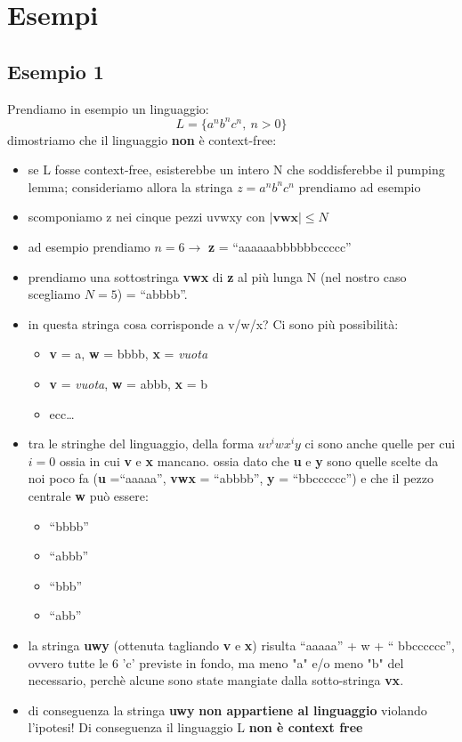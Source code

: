 \documentclass[a4paper]{report}
\begin{document}
\chapter{Esempi}
\section{Esempio 1}
Prendiamo in esempio un linguaggio:
\[ L = \{a^nb^nc^n,\ n > 0 \}\]
dimostriamo che il linguaggio \textbf{non} è context-free:
\begin{itemize}
\item se L fosse context-free, esisterebbe un intero N che soddisferebbe il pumping lemma; consideriamo allora la stringa \(z = a^nb^nc^n\) prendiamo ad esempio 
\item scomponiamo z nei cinque pezzi uvwxy con \(\left | \textbf{vwx} \right | \le N\)
\item ad esempio prendiamo \(n = 6 \rightarrow \) \textbf{z} = ``aaaaaabbbbbbccccc''
\item prendiamo una sottostringa \textbf{vwx} di \textbf{z} al più lunga N (nel nostro caso scegliamo \(N = 5\)) = ``abbbb''.
\item in questa stringa cosa corrisponde a v/w/x? Ci sono più possibilità:
\begin{itemize}
\item \textbf{v} = a, \textbf{w} = bbbb, \textbf{x} = \emph{vuota}
\item \textbf{v} = \emph{vuota}, \textbf{w} = abbb, \textbf{x} = b
\item ecc\dots
\end{itemize}
\item tra le stringhe del linguaggio, della forma \(uv^iwx^iy\) ci sono anche quelle per cui \(i = 0\) ossia in cui \textbf{v} e \textbf{x} mancano. ossia dato che \textbf{u} e \textbf{y} sono quelle scelte da noi poco fa (\textbf{u} =``aaaaa'', \textbf{vwx} = ``abbbb'', \textbf{y} = ``bbcccccc'') e che il pezzo centrale \textbf{w} può essere:
\begin{itemize}
\item ``bbbb''
\item ``abbb''
\item ``bbb''
\item ``abb''
\end{itemize}
\item la stringa \textbf{uwy} (ottenuta tagliando \textbf{v} e \textbf{x}) risulta ``aaaaa'' + w + `` bbcccccc'', ovvero tutte le 6 'c' previste in fondo, ma meno "a" e/o meno "b" del necessario, perchè alcune sono state mangiate dalla sotto-stringa \textbf{vx}.
\item di conseguenza la stringa \textbf{uwy} \textbf{non appartiene al linguaggio} violando l'ipotesi! Di conseguenza il linguaggio L \textbf{non è context free}
\end{itemize}
\end{document}
